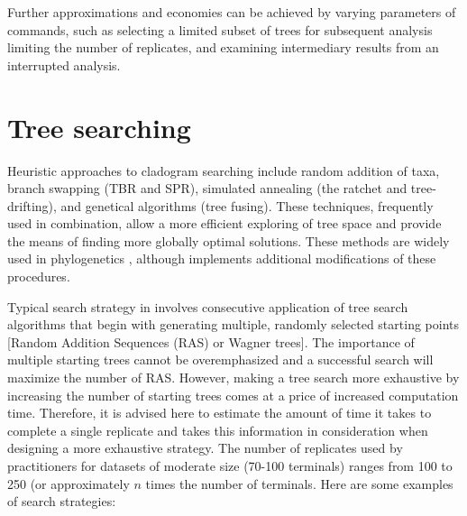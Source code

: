 Further approximations and economies can be achieved by varying parameters of commands, such as selecting a limited 
subset of trees for subsequent analysis limiting the number of replicates, and examining intermediary results from an 
interrupted analysis.

\section{Tree searching}
Heuristic approaches to cladogram searching include random addition of taxa, branch swapping (TBR and SPR), 
simulated annealing (the ratchet and tree-drifting), and genetical algorithms (tree fusing). These techniques, frequently 
used in combination, allow a more efficient exploring of tree space and provide the means of finding more globally 
optimal solutions. These methods are widely used in phylogenetics \cite{felsenstein2004a, wheeleretal2006}, although 
\poy implements additional modifications of these procedures.

Typical search strategy in \poy involves consecutive application of tree search algorithms that begin with generating 
multiple, randomly selected starting points [Random Addition Sequences (RAS) or Wagner trees]. The importance 
of multiple starting trees cannot be overemphasized and a successful search will maximize the number of RAS.
 However, making a tree search more exhaustive by increasing the number of starting trees comes at a price of increased 
 computation time. Therefore, it is advised here to estimate the amount of time it takes to complete a single replicate 
 and takes this information in consideration when designing a more exhaustive strategy. The  number of replicates 
 used by \poy practitioners for datasets of moderate size (70-100 terminals) ranges from 100 to 250 (or approximately 
 $n$ times the number of terminals. Here are some  examples of search strategies:
 
